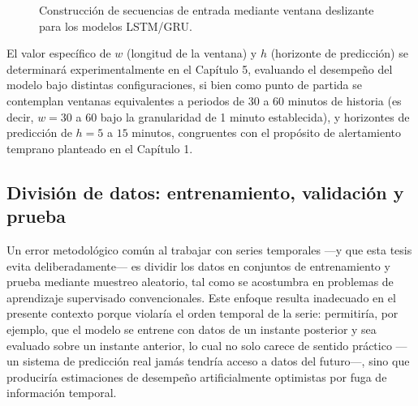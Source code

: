 \documentclass[12pt]{report}
\begin{document}
\begin{figure}[H]
    \centering
    \caption{Construcción de secuencias de entrada mediante ventana deslizante para los modelos LSTM/GRU.}
    \label{fig:ventaneo}
\end{figure}

El valor específico de $w$ (longitud de la ventana) y $h$ (horizonte de predicción) se determinará experimentalmente en el Capítulo 5, evaluando el desempeño del modelo bajo distintas configuraciones, si bien como punto de partida se contemplan ventanas equivalentes a periodos de 30 a 60 minutos de historia (es decir, $w = 30$ a $60$ bajo la granularidad de 1 minuto establecida), y horizontes de predicción de $h = 5$ a $15$ minutos, congruentes con el propósito de alertamiento temprano planteado en el Capítulo 1.

\subsection*{División de datos: entrenamiento, validación y prueba}

Un error metodológico común al trabajar con series temporales ---y que esta tesis evita deliberadamente--- es dividir los datos en conjuntos de entrenamiento y prueba mediante muestreo aleatorio, tal como se acostumbra en problemas de aprendizaje supervisado convencionales. Este enfoque resulta inadecuado en el presente contexto porque violaría el orden temporal de la serie: permitiría, por ejemplo, que el modelo se entrene con datos de un instante posterior y sea evaluado sobre un instante anterior, lo cual no solo carece de sentido práctico 
---un sistema de predicción real jamás tendría acceso a datos del futuro---, sino que produciría estimaciones de desempeño artificialmente optimistas por fuga de información temporal.
\end{document}
